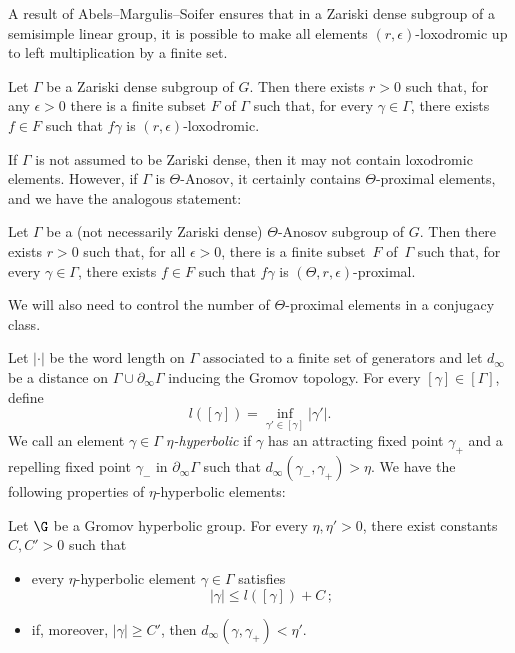 A result of Abels--Margulis--Soifer ensures that in a Zariski dense subgroup of a semisimple linear group, it is possible to make all elements $(r,\epsilon)$-loxodromic up to left multiplication by a finite set.
\begin{lemma}\label{lem-AMS}
Let $\Gamma$ be a Zariski dense subgroup of $G$. Then there exists $r>0$ such that, for any $\epsilon>0$ there is a finite subset $F$ of $\Gamma$ such that, for every $\gamma \in \Gamma$, there exists $f\in F$ such that $f\gamma$ is $(r,\epsilon)$-loxodromic.
\end{lemma}

If $\Gamma$ is not assumed to be Zariski dense, then it may not contain loxodromic elements. However, if $\Gamma$ is $\Theta$-Anosov, it certainly contains $\Theta$-proximal elements, and we have the analogous statement:

\begin{lemma}\label{lem-AMS guichard wienhard}
Let $\Gamma$ be a (not necessarily Zariski dense) $\Theta$-Anosov subgroup of $G$. Then there exists $r>0$ such that, for all $\epsilon>0$, there is a finite subset~$F$ of~$\Gamma$ such that, for every $\gamma \in \Gamma$, there exists $f\in F$ such that $f\gamma$ is $(\Theta,r,\epsilon)$-proximal.
\end{lemma}

We will also need to control the number of $\Theta$-proximal elements in a conjugacy class.

\Changel

Let $\vert \cdot \vert$ be the word length on $\Gamma$ associated to a finite set of generators and let $d_\infty$ be a distance on $\Gamma \cup \partial_\infty \Gamma$ inducing the Gromov topology. For every $[\gamma] \in [\Gamma]$, define
\[l([\gamma]) = \inf_{\gamma'\in [\gamma]} \vert \gamma'\vert.\]
We call an element $\gamma \in \Gamma$ \emph{$\eta$-hyperbolic} if $\gamma$ has an attracting fixed point $\gamma_+$ and a repelling fixed point $\gamma_-$ in $\partial_\infty \Gamma$ such that $d_\infty (\gamma_-,\gamma_+) >\eta$. We have the following properties of $\eta$-hyperbolic elements:

\begin{prop} \label{prop-Properties hyperbolic elements}
Let $\G$ be a Gromov hyperbolic group. For every $\eta, \eta'>0$, there exist constants $C,C'>0$ such that
\begin{itemize}
\item every $\eta$-hyperbolic element $\gamma \in \Gamma$ satisfies
\[\vert \gamma \vert \leq l([\gamma]) + C\,;\]
\item if, moreover, $\vert \gamma \vert \geq C'$, then $d_\infty(\gamma, \gamma_+) <\eta'$.
\end{itemize}
\end{prop}

